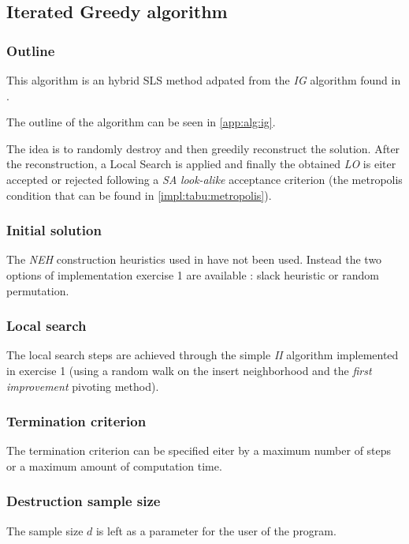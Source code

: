\subsection{Iterated Greedy algorithm}
\label{impl:ig}

\subsubsection{Outline}

This algorithm is an hybrid SLS method adpated from the \emph{IG} algorithm found in \cite{DBLP:journals/eor/RuizS08}.

The outline of the algorithm can be seen in \ref{app:alg:ig}.

The idea is to randomly destroy and then greedily reconstruct the solution.
After the reconstruction, a Local Search is applied and finally the obtained \emph{LO} is eiter accepted or rejected following a \emph{SA} \emph{look-alike} acceptance criterion (the metropolis condition that can be found in \ref{impl:tabu:metropolis}).


\subsubsection{Initial solution}

The \emph{NEH} construction heuristics used in \cite{DBLP:journals/eor/RuizS08} have not been used. Instead the two options of implementation exercise 1 are available : slack heuristic or random permutation.


\subsubsection{Local search}

The local search steps are achieved through the simple \emph{II} algorithm implemented in exercise 1 (using a random walk on the insert neighborhood and the \emph{first improvement} pivoting method).


\subsubsection{Termination criterion}

The termination criterion can be specified eiter by a maximum number of steps or a maximum amount of computation time.

\subsubsection{Destruction sample size}

The sample size $d$ is left as a parameter for the user of the program.
